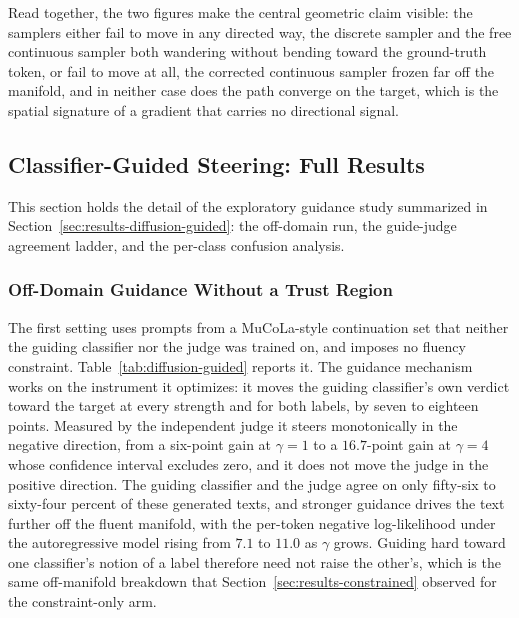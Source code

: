 Read together, the two figures make the central geometric claim visible: the samplers either fail to move in any directed way, the discrete sampler and the free continuous sampler both wandering without bending toward the ground-truth token, or fail to move at all, the corrected continuous sampler frozen far off the manifold, and in neither case does the path converge on the target, which is the spatial signature of a gradient that carries no directional signal.

\clearpage
\subsection{Classifier-Guided Steering: Full Results}
\label{app:guided}

This section holds the detail of the exploratory guidance study summarized in
Section~\ref{sec:results-diffusion-guided}: the off-domain run, the guide-judge agreement
ladder, and the per-class confusion analysis.

\subsubsection{Off-Domain Guidance Without a Trust Region}
\label{app:guided-offdomain}

The first setting uses prompts from a MuCoLa-style continuation set that neither the guiding
classifier nor the judge was trained on, and imposes no fluency constraint.
Table~\ref{tab:diffusion-guided} reports it. The guidance mechanism works on the instrument
it optimizes: it moves the guiding classifier's own verdict toward the target at every
strength and for both labels, by seven to eighteen points. Measured by the independent judge
it steers monotonically in the negative direction, from a six-point gain at $\gamma=1$ to a
$16.7$-point gain at $\gamma=4$ whose confidence interval excludes zero, and it does not move
the judge in the positive direction. The guiding classifier and the judge agree on only
fifty-six to sixty-four percent of these generated texts, and stronger guidance drives the
text further off the fluent manifold, with the per-token negative log-likelihood under the
autoregressive model rising from $7.1$ to $11.0$ as $\gamma$ grows.
Guiding hard toward one classifier's notion of a label therefore need not raise the other's,
which is the same off-manifold breakdown that Section~\ref{sec:results-constrained} observed
for the constraint-only arm.

